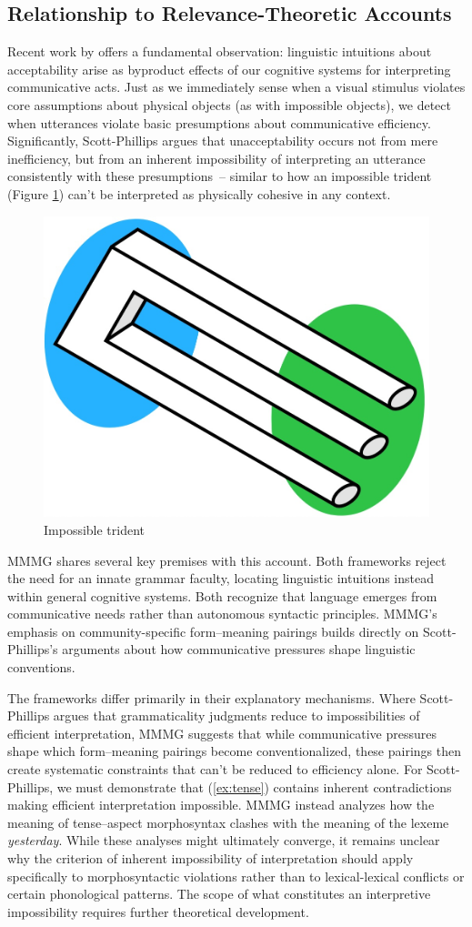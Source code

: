 \documentclass[12pt,letterpaper]{article}
\begin{document}
\subsection{Relationship to Relevance-Theoretic Accounts}

Recent work by \textcite{scottphillips2024communication} offers a fundamental observation: linguistic intuitions about acceptability arise as byproduct effects of our cognitive systems for interpreting communicative acts. Just as we immediately sense when a visual stimulus violates core assumptions about physical objects (as with impossible objects), we detect when utterances violate basic presumptions about communicative efficiency. Significantly, Scott-Phillips argues that unacceptability occurs not from mere inefficiency, but from an inherent impossibility of interpreting an utterance consistently with these presumptions~-- similar to how an impossible trident (Figure \ref{fig:impossible trident}) can't be interpreted as physically cohesive in any context.

\begin{figure}
    \centering
    \includegraphics[width=0.2\linewidth]{trident.jpg}
    \caption{Impossible trident}
    \label{fig:impossible trident}
\end{figure}

MMMG shares several key premises with this account. Both frameworks reject the need for an innate grammar faculty, locating linguistic intuitions instead within general cognitive systems. Both recognize that language emerges from communicative needs rather than autonomous syntactic principles. MMMG's emphasis on community-specific form--meaning pairings builds directly on Scott-Phillips's arguments about how communicative pressures shape linguistic conventions.

The frameworks differ primarily in their explanatory mechanisms. Where Scott-Phillips argues that grammaticality judgments reduce to impossibilities of efficient interpretation, MMMG suggests that while communicative pressures shape which form--meaning pairings become conventionalized, these pairings then create systematic constraints that can't be reduced to efficiency alone. For Scott-Phillips, we must demonstrate that (\ref{ex:tense}) contains inherent contradictions making efficient interpretation impossible. MMMG instead analyzes how the meaning of tense--aspect morphosyntax clashes with the meaning of the lexeme \textit{yesterday}. While these analyses might ultimately converge, it remains unclear why the criterion of inherent impossibility of interpretation should apply specifically to morphosyntactic violations rather than to lexical-lexical conflicts or certain phonological patterns. The scope of what constitutes an interpretive impossibility requires further theoretical development.
\end{document}
